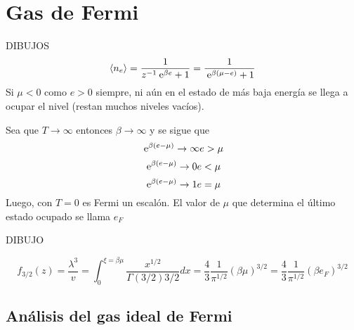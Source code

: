 \documentclass[10pt,oneside]{CBFT_book}
\begin{document}
\chapter{Gas de Fermi}

DIBUJOS
\[
	\braket{n_e} = \frac{1}{z^{-1} \:\mathrm{e}^{\beta e} + 1 } = \frac{1}{ \:\mathrm{e}^{\beta ( \mu - e) } + 1 }
\]
Si $ \mu < 0 $ como $ e > 0 $ siempre, ni aún en el estado de más baja energía se llega a ocupar el
nivel (restan muchos niveles vacíos).

Sea que $ T \to \infty $ entonces $ \beta \to \infty $ y se sigue que 
\[
	\:\mathrm{e}^{\beta(e-\mu)} \to \infty e> \mu
\]
\[
	\:\mathrm{e}^{\beta(e-\mu)} \to 0 e< \mu
\]
\[
	\:\mathrm{e}^{\beta(e-\mu)} \to 1 e = \mu
\]
Luego, con $ T = 0 $ es Fermi un escalón. El valor de $ \mu $ que determina el último
estado ocupado se llama $ e_F$ 

DIBUJO

\[
	f_{3/2}(z) = \frac{\lambda^3}{v} = \int_0^{\xi = \beta\mu } \frac{x^{1/2}}{\Gamma(3/2)3/2}dx =
	\frac{4}{3} \frac{1}{\pi^{1/2}} ( \beta\mu )^{3/2} = 
	\frac{4}{3} \frac{1}{\pi^{1/2}} ( \beta e_F )^{3/2}
\]

\section{Análisis del gas ideal de Fermi}
\end{document}
